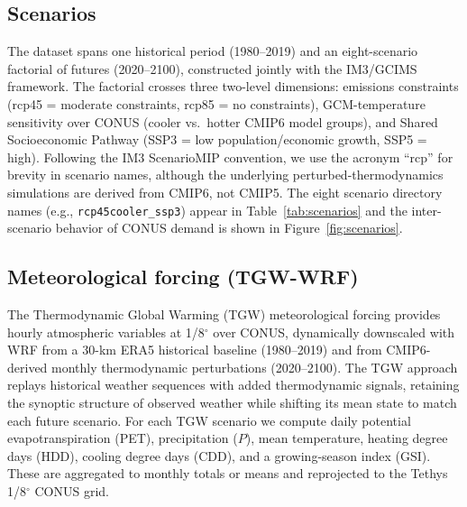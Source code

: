 \documentclass[fleqn,10pt]{wlscirep}
\begin{document}
\subsection*{Scenarios}

The dataset spans one historical period (1980--2019) and an eight-scenario factorial of futures (2020--2100), constructed jointly with the IM3/GCIMS framework\cite{Mongird2025CERF}. The factorial crosses three two-level dimensions: emissions constraints (rcp45 = moderate constraints, rcp85 = no constraints), GCM-temperature sensitivity over CONUS (cooler vs.\ hotter CMIP6 model groups), and Shared Socioeconomic Pathway (SSP3 = low population/economic growth, SSP5 = high). Following the IM3 ScenarioMIP convention, we use the acronym ``rcp'' for brevity in scenario names, although the underlying perturbed-thermodynamics simulations are derived from CMIP6, not CMIP5\cite{Mongird2025CERF}. The eight scenario directory names (e.g., \texttt{rcp45cooler\_ssp3}) appear in Table~\ref{tab:scenarios} and the inter-scenario behavior of CONUS demand is shown in Figure~\ref{fig:scenarios}.

\subsection*{Meteorological forcing (TGW-WRF)}

The Thermodynamic Global Warming (TGW) meteorological forcing\cite{Jones2023TGW} provides hourly atmospheric variables at 1/8$^{\circ}$ over CONUS, dynamically downscaled with WRF from a 30-km ERA5 historical baseline (1980--2019) and from CMIP6-derived monthly thermodynamic perturbations (2020--2100). The TGW approach replays historical weather sequences with added thermodynamic signals, retaining the synoptic structure of observed weather while shifting its mean state to match each future scenario. For each TGW scenario we compute daily potential evapotranspiration (PET), precipitation ($P$), mean temperature, heating degree days (HDD), cooling degree days (CDD), and a growing-season index (GSI). These are aggregated to monthly totals or means and reprojected to the Tethys 1/8$^{\circ}$ CONUS grid.
\end{document}

